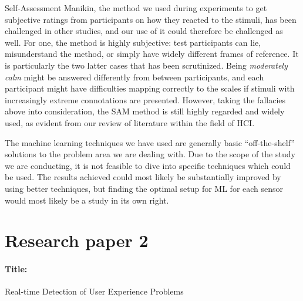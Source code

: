 Self-Assessment Manikin, the method we used during experiments to get subjective
ratings from participants on how they reacted to the stimuli, has been
challenged in other studies, and our use of it could therefore be challenged as
well. For one, the method is highly subjective: test participants can lie,
misunderstand the method, or simply have widely different frames of
reference. It is particularly the two latter cases that has been
scrutinized. Being \textit{moderately calm} might be answered differently from
between participants, and each participant might have difficulties mapping
correctly to the scales if stimuli with increasingly extreme connotations are
presented. However, taking the fallacies above into consideration, the SAM
method is still highly regarded and widely used, as evident from our review of
literature within the field of HCI.

The machine learning techniques we have used are generally basic ``off-the-shelf'' solutions to the problem area we are dealing with.
Due to the scope of the study we are conducting, it is not feasible to dive into specific techniques which could be used.
The results achieved could most likely be substantially improved by using better techniques, but finding the optimal setup for ML for each sensor would most likely be a study in its own right.


\section{Research paper 2}
\paragraph{Title:}
Real-time Detection of User Experience Problems
